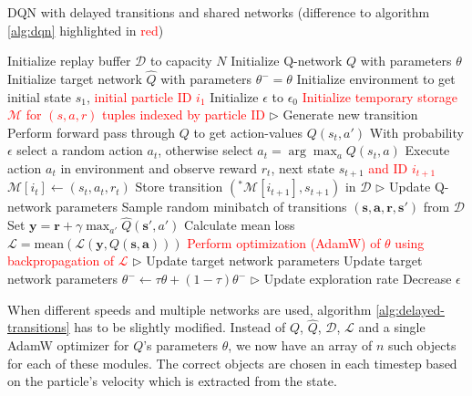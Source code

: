 \begin{algorithm}[h]
    \caption{DQN with delayed transitions and shared networks (difference to algorithm \ref{alg:dqn} highlighted in \textcolor{red}{red})}
    \label{alg:delayed-transitions}
    \begin{algorithmic}
        \State Initialize replay buffer $\mathcal{D}$ to capacity $N$
        \State Initialize Q-network $Q$ with parameters $\theta$
        \State Initialize target network $\hat{Q}$ with parameters $\theta^-=\theta$
        \State Initialize environment to get initial state $s_1$, \textcolor{red}{initial particle ID $i_1$}
        \State Initialize $\epsilon$ to $\epsilon_0$
        \State \textcolor{red}{Initialize temporary storage $\mathcal{M}$ for $(s,a,r)$ tuples indexed by particle ID}
            \State $\triangleright$ Generate new transition
            \State Perform forward pass through $Q$ to get action-values $Q(s_t, a')$ 
            \State With probability $\epsilon$ select a random action $a_t$, otherwise select $a_t = \arg\!\max_a Q(s_t, a)$
            \State Execute action $a_t$ in environment and observe reward $r_t$, next state $s_{t+1}$ \textcolor{red}{and ID $i_{t+1}$}
            \color{red}
            \State $\mathcal{M}[i_t] \gets (s_t, a_t, r_t)$ 
                \State Store transition $(^*\mathcal{M}[i_{t+1}], s_{t+1})$ in $\mathcal{D}$
            \EndIf
            \normalcolor
            \State $\triangleright$ Update Q-network parameters
            \State Sample random minibatch of transitions $(\bm{s}, \bm{a}, \bm{r}, \bm{s'})$ from $\mathcal{D}$
            \State Set $\bm{y} = \bm{r} + \gamma \max_{a'} \hat{Q}(\bm{s'}, a')$
            \State Calculate mean loss $\mathcal{L} = \text{mean}(\mathcal{L}(\bm{y}, Q(\bm{s}, \bm{a})))$
            \State \textcolor{red}{Perform optimization (AdamW) of $\theta$ using backpropagation of $\mathcal{L}$}
            \State $\triangleright$ Update target network parameters
            \State Update target network parameters $\theta^- \gets \tau \theta + (1 - \tau) \theta^-$
            \State $\triangleright$ Update exploration rate
            \State Decrease $\epsilon$   
        \EndFor
    \end{algorithmic}
\end{algorithm}
When different speeds and multiple networks are used, algorithm \ref{alg:delayed-transitions} has to be slightly modified. Instead of $Q$, $\hat{Q}$, $\mathcal{D}$, $\mathcal{L}$ and a single AdamW optimizer for $Q$'s parameters $\theta$, we now have an array of $n$ such objects for each of these modules. The correct objects are chosen in each timestep based on the particle's velocity which is extracted from the state. 

